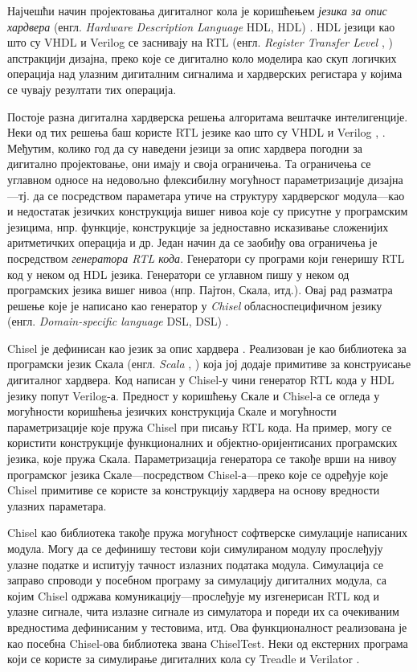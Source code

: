 \documentclass[master]{finthesis}
\makeatletter
\newcommand*{\engl}[2][\@empty]{%
    \edef\theacronym{#1}%
    (енгл. \foreignlanguage{english}{\emph{#2}%
    \ifx\theacronym\@empty \else , #1\fi})%
}
\makeatother
\begin{document}
Најчешћи начин пројектовања дигиталног кола је коришћењем \emph{језика за опис хардвера} \engl[HDL]{Hardware Description Language} \cite{vahid2010digital}. HDL језици као што су VHDL \cite{ieee1076-2019} и Verilog \cite{ieee1800-2017} се заснивају на RTL \engl{Register Transfer Level} апстракцији дизајна, преко које се дигитално коло моделира као скуп логичких операција над улазним дигиталним сигналима и хардверских регистара у којима се чувају резултати тих операција.

Постоје разна дигитална хардверска решења алгоритама вештачке интелигенције. Неки од тих решења баш користе RTL језике као што су VHDL и Verilog \cite{mohsin2018fpga}, \cite{ito2018nearest}. Међутим, колико год да су наведени језици за опис хардвера погодни за дигитално пројектовање, они имају и своја ограничења. Та ограничења се углавном односе на недовољно флексибилну могућност параметризације дизајна---тј. да се посредством параметара утиче на структуру хардверског модула---као и недостатак језичких конструкција вишег нивоа које су присутне у програмским језицима, нпр. функције, конструкције за једноставно исказивање сложенијих аритметичких операција и др. Један начин да се заобиђу ова ограничења је посредством \emph{генератора RTL кода}. Генератори су програми који генеришу RTL код у неком од HDL језика. Генератори се углавном пишу у неком од програмских језика вишег нивоа (нпр. Пајтон, Скала, итд.). Овај  рад разматра решење које је написано као генератор у \emph{Chisel} \cite{bachrach2012chisel} обласно\Hyphdash специфичном језику \engl[DSL]{Domain-specific language}.

Chisel је дефинисан као језик за опис хардвера \cite{chiselsite}. Реализован је као библиотека за програмски језик Скала \engl{Scala} \cite{scalasite} која јој додаје примитиве за конструисање дигиталног хардвера. Код написан у Chisel-у чини генератор RTL кода у HDL језику попут Verilog-а. Предност у коришћењу Скале и Chisel-а се огледа у могућности коришћења језичких конструкција Скале и могућности параметризације које пружа Chisel при писању RTL кода. На пример, могу се користити конструкције функционалних и објектно-оријентисаних програмских језика, које пружа Скала. Параметризација генератора се такође врши на нивоу програмског језика Скале---посредством Chisel-а---преко које се одређује које Chisel примитиве се користе за конструкцију хардвера на основу вредности улазних параметара.

Chisel као библиотека такође пружа могућност софтверске симулације написаних модула. Могу да се дефинишу тестови који симулираном модулу прослеђују улазне податке и испитују тачност излазних података модула. Симулација се заправо спроводи у посебном програму за симулацију дигиталних модула, са којим Chisel одржава комуникацију---прослеђује му изгенерисан RTL код и улазне сигнале, чита излазне сигнале из симулатора и пореди их са очекиваним вредностима дефинисаним у тестовима, итд. Ова функционалност реализована је као посебна Chisel-ова библиотека звана ChiselTest. Неки од екстерних програма који се користе за симулирање дигиталних кола су Treadle и Verilator \cite{chiseltest}.
\end{document}
